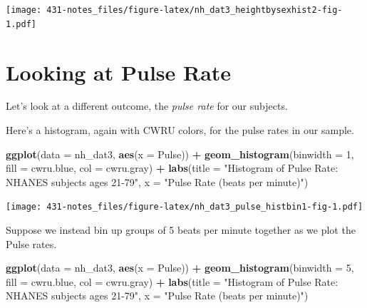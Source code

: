 \documentclass[
]{book}
\newenvironment{Shaded}{\begin{snugshade}}{\end{snugshade}}
\newcommand{\DataTypeTok}[1]{\textcolor[rgb]{0.13,0.29,0.53}{#1}}
\newcommand{\DecValTok}[1]{\textcolor[rgb]{0.00,0.00,0.81}{#1}}
\newcommand{\KeywordTok}[1]{\textcolor[rgb]{0.13,0.29,0.53}{\textbf{#1}}}
\newcommand{\NormalTok}[1]{#1}
\newcommand{\OperatorTok}[1]{\textcolor[rgb]{0.81,0.36,0.00}{\textbf{#1}}}
\newcommand{\StringTok}[1]{\textcolor[rgb]{0.31,0.60,0.02}{#1}}
\begin{document}
\texttt{[image: 431-notes\_files/figure-latex/nh\_dat3\_heightbysexhist2-fig-1.pdf]}

\hypertarget{looking-at-pulse-rate}{%
\section{Looking at Pulse Rate}\label{looking-at-pulse-rate}}

Let's look at a different outcome, the \emph{pulse rate} for our subjects.

Here's a histogram, again with CWRU colors, for the pulse rates in our sample.

\begin{Shaded}
\begin{Highlighting}[]
\KeywordTok{ggplot}\NormalTok{(}\DataTypeTok{data =}\NormalTok{ nh_dat3, }\KeywordTok{aes}\NormalTok{(}\DataTypeTok{x =}\NormalTok{ Pulse)) }\OperatorTok{+}\StringTok{ }
\StringTok{    }\KeywordTok{geom_histogram}\NormalTok{(}\DataTypeTok{binwidth =} \DecValTok{1}\NormalTok{, }\DataTypeTok{fill =}\NormalTok{ cwru.blue, }\DataTypeTok{col =}\NormalTok{ cwru.gray) }\OperatorTok{+}\StringTok{ }
\StringTok{    }\KeywordTok{labs}\NormalTok{(}\DataTypeTok{title =} \StringTok{"Histogram of Pulse Rate: NHANES subjects ages 21-79"}\NormalTok{,}
         \DataTypeTok{x =} \StringTok{"Pulse Rate (beats per minute)"}\NormalTok{)}
\end{Highlighting}
\end{Shaded}

\texttt{[image: 431-notes\_files/figure-latex/nh\_dat3\_pulse\_histbin1-fig-1.pdf]}

Suppose we instead bin up groups of 5 beats per minute together as we plot the Pulse rates.

\begin{Shaded}
\begin{Highlighting}[]
\KeywordTok{ggplot}\NormalTok{(}\DataTypeTok{data =}\NormalTok{ nh_dat3, }\KeywordTok{aes}\NormalTok{(}\DataTypeTok{x =}\NormalTok{ Pulse)) }\OperatorTok{+}\StringTok{ }
\StringTok{    }\KeywordTok{geom_histogram}\NormalTok{(}\DataTypeTok{binwidth =} \DecValTok{5}\NormalTok{, }\DataTypeTok{fill =}\NormalTok{ cwru.blue, }\DataTypeTok{col =}\NormalTok{ cwru.gray) }\OperatorTok{+}\StringTok{ }
\StringTok{    }\KeywordTok{labs}\NormalTok{(}\DataTypeTok{title =} \StringTok{"Histogram of Pulse Rate: NHANES subjects ages 21-79"}\NormalTok{,}
         \DataTypeTok{x =} \StringTok{"Pulse Rate (beats per minute)"}\NormalTok{)}
\end{Highlighting}
\end{Shaded}
\end{document}
